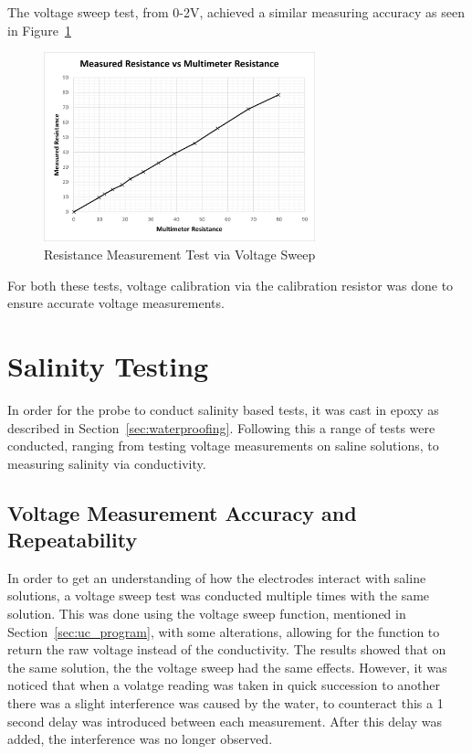 The voltage sweep test, from 0-2V, achieved a similar measuring accuracy as seen in Figure~\ref{fig:resistance_measurement_test}
\begin{figure}[H]\label{fig:resistance_measurement_test}
    \centering
    \includegraphics[width=0.7\textwidth]{figures/resistance_measurement_test.png}
    \caption{Resistance Measurement Test via Voltage Sweep}
    \label{fig:resistance_measurement_test}
\end{figure}

For both these tests, voltage calibration via the calibration resistor was done to ensure accurate voltage measurements.

\section{Salinity Testing}
In order for the probe to conduct salinity based tests, it was cast in epoxy as described in Section~\ref{sec:waterproofing}.
Following this a range of tests were conducted, ranging from testing voltage measurements on saline solutions, to measuring salinity via conductivity.

\subsection{Voltage Measurement Accuracy and Repeatability}
In order to get an understanding of how the electrodes interact with saline solutions, a voltage sweep test was conducted multiple times with the same solution.
This was done using the voltage sweep function, mentioned in Section~\ref{sec:uc_program}, with some alterations, allowing for the function to return the raw voltage instead of the conductivity.
The results showed that on the same solution, the the voltage sweep had the same effects.
However, it was noticed that when a volatge reading was taken in quick succession to another there was a slight interference was caused by the water, to counteract this a 1 second delay was introduced between each measurement.
After this delay was added, the interference was no longer observed.

